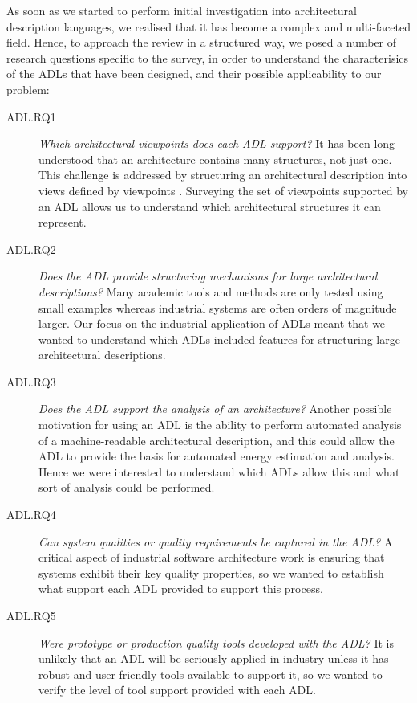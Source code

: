 As soon as we started to perform initial investigation into architectural description languages, we realised that it has become a complex and multi-faceted field.  Hence, to approach the review in a structured way, we posed a number of research questions specific to the survey, in order to understand the characterisics of the ADLs that have been designed, and their possible applicability to our problem:

\begin{description}
\item[ADL.RQ1] \emph{Which architectural viewpoints does each ADL support?}  It has been long understood that an architecture contains many structures, not just one.  This challenge is addressed by structuring an architectural description into views defined by viewpoints \cite{iso-42010}. Surveying the set of viewpoints supported by an ADL allows us to understand which architectural structures it can represent.

\item[ADL.RQ2] \emph{Does the ADL provide structuring mechanisms for large architectural descriptions?}  Many academic tools and methods are only tested using small examples whereas industrial systems are often orders of magnitude larger.  Our focus on the industrial application of ADLs meant that we wanted to understand which ADLs included features for structuring large architectural descriptions.

\item[ADL.RQ3] \emph{Does the ADL support the analysis of an architecture?}  Another possible motivation for using an ADL is the ability to perform automated analysis of a machine-readable architectural description, and this could allow the ADL to provide the basis for automated energy estimation and analysis. Hence we were interested to understand which ADLs allow this and what sort of analysis could be performed.

\item[ADL.RQ4] \emph{Can system qualities or quality requirements be captured in the ADL?}  A critical aspect of industrial software architecture work is ensuring that systems exhibit their key quality properties, so we wanted to establish what support each ADL provided to support this process.

\item[ADL.RQ5] \emph{Were prototype or production quality tools developed with the ADL?}  It is unlikely that an ADL will be seriously applied in industry unless it has robust and user-friendly tools available to support it, so we wanted to verify the level of tool support provided with each ADL.


\end{description}
